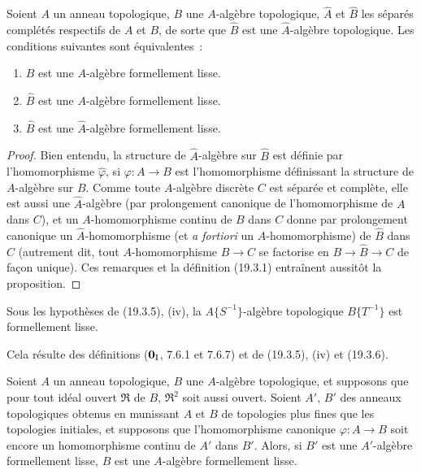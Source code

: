 
\begin{proposition}[19.3.6]
\label{0.19.3.6-fr}
Soient $A$ un anneau topologique, $B$ une $A$-algèbre topologique, $\hat A$
et $\hat B$ les séparés complétés respectifs de $A$ et $B$, de sorte que
$\hat B$ est une $\hat A$-algèbre topologique. Les conditions suivantes
sont équivalentes~:
\begin{enumerate}
  \item[a)] $B$ est une $A$-algèbre formellement lisse.
  \item[b)] $\hat B$ est une $A$-algèbre formellement lisse.
  \item[c)] $\hat B$ est une $\hat A$-algèbre formellement lisse.
\end{enumerate}
\end{proposition}

\begin{proof}
Bien entendu, la structure de $\hat A$-algèbre sur $\hat B$ est définie
par l'homomorphisme $\hat\varphi$, si $\varphi:A\to B$ est
l'homomorphisme définissant la structure de $A$-algèbre sur $B$. Comme toute
$A$-algèbre discrète $C$ est séparée et complète, elle est aussi une
$\hat A$-algèbre (par prolongement canonique de l'homomorphisme de $A$ dans
$C$), et un $A$-homomorphisme continu de $B$ dans $C$ donne par prolongement
canonique un $\hat A$-homomorphisme (et \emph{a fortiori} un
$A$-homomorphisme) de $\hat B$ dans $C$ (autrement dit, tout
$A$-homomorphisme $B\to C$ se factorise en $B\to\hat B\to C$ de façon
unique). Ces remarques et la définition (19.3.1) entraînent aussitôt la
proposition.
\end{proof}

\begin{corollary}[19.3.7]
\label{0.19.3.7-fr}
Sous les hypothèses de (19.3.5), (iv), la $A\{S^{-1}\}$-algèbre topologique
$B\{T^{-1}\}$ est formellement lisse.
\end{corollary}

Cela résulte des définitions ($\mathbf 0_{\rm I}$, 7.6.1 et 7.6.7) et de
(19.3.5), (iv) et (19.3.6).

\begin{proposition}[19.3.8]
\label{0.19.3.8-fr}
Soient $A$ un anneau topologique, $B$ une $A$-algèbre topologique, et supposons
que pour tout idéal ouvert $\mathfrak R$ de $B$, $\mathfrak R^2$ soit aussi
ouvert. Soient $A'$, $B'$ des anneaux topologiques obtenus en munissant $A$ et
$B$ de topologies plus fines que les topologies initiales, et supposons que
l'homomorphisme canonique $\varphi:A\to B$ soit encore un homomorphisme
continu de $A'$ dans $B'$. Alors, si $B'$ est une $A'$-algèbre formellement
lisse, $B$ est une $A$-algèbre formellement lisse.
\end{proposition}

